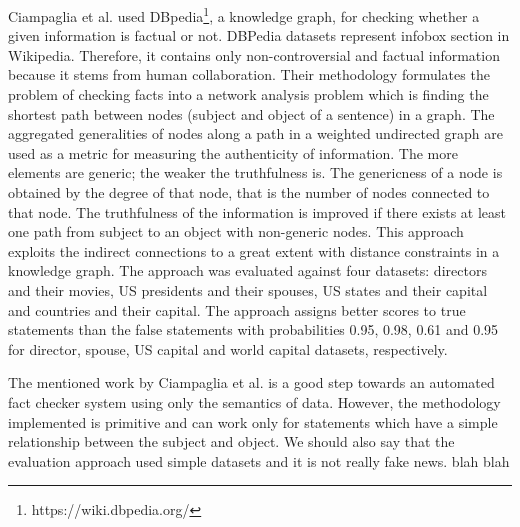 \documentclass[a4paper, 11pt]{article}
\begin{document}
Ciampaglia et al. \parencite{Ciampaglia2015} used DBpedia\footnote{https://wiki.dbpedia.org/}, a knowledge graph, for checking whether a given information is factual or not. DBPedia datasets represent infobox section in Wikipedia. Therefore, it contains only non-controversial and factual information because it stems from human collaboration. Their methodology formulates the problem of checking facts into a network analysis problem which is finding the shortest path between nodes (subject and object of a sentence) in a graph. The aggregated generalities of nodes along a path in a weighted undirected graph are used as a metric for measuring the authenticity of information. The more elements are generic; the weaker the truthfulness is.  The genericness of a node is obtained by the degree of that node, that is the number of nodes connected to that node. The truthfulness of the information is improved if there exists at least one path from subject to an object with non-generic nodes. This approach exploits the indirect connections to a great extent with distance constraints in a knowledge graph. The approach was evaluated against four datasets: directors and their movies, US presidents and their spouses, US states and their capital and countries and their capital. The approach assigns better scores to true statements than the false statements with probabilities 0.95, 0.98, 0.61 and 0.95 for director, spouse, US capital and world capital datasets, respectively.

The mentioned work by Ciampaglia et al. is a good step towards an automated fact checker system using only the semantics of data. However, the methodology implemented is primitive and can work only for statements which have a simple relationship between the subject and object. We should also say that the evaluation approach used simple datasets and it is not really fake news. blah blah





\end{document}
